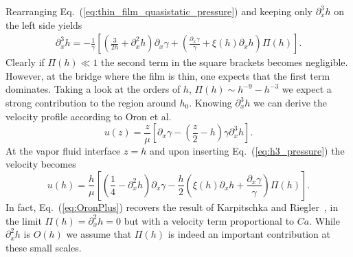 \documentclass[twocolumn,amsmath,amssymb,showpacs,pre,nofootinbib,superscriptaddress]{revtex4-1} %
\begin{document}
Rearranging Eq.~(\ref{eq:thin_film_quasistatic_pressure}) and keeping only $\partial_x^3 h$ on the left side yields
\begin{align}\label{eq:h3_pressure}
    \partial_x^3 h = -\frac{1}{\gamma}\left[\left(\frac{3}{2 h} + \partial_x^2 h \right)\partial_x\gamma 
    + \left(\frac{\partial_x\gamma}{\gamma}+\xi(h)\partial_x h\right)\Pi(h)\right].
\end{align}
Clearly if $\Pi(h)\ll 1$ the second term in the square brackets becomes negligible.
However, at the bridge where the film is thin, one expects that the first term dominates.
Taking a look at the orders of $h$, $\Pi(h) \sim h^{-9}-h^{-3}$ we expect a strong contribution to the region around $h_0$.
Knowing $\partial_x^3 h$ we can derive the velocity profile according to Oron et al.~\cite{RevModPhys.69.931}
\begin{equation}\label{eq:Oron_vel}
    u(z) = \frac{z}{\mu}\left[\partial_x\gamma - \left(\frac{z}{2} - h\right)\gamma\partial_x^3 h\right].
\end{equation}
At the vapor fluid interface $z=h$ and upon inserting Eq.~(\ref{eq:h3_pressure}) the velocity becomes
\begin{equation}\label{eq:OronPlus}
     u(h) = \frac{h}{\mu}\left[\left(\frac{1}{4}-\partial_x^2 h\right)\partial_x\gamma - \frac{h}{2}\left( \xi(h)\partial_x h + \frac{\partial_x\gamma}{\gamma}\right)\Pi(h)\right].
\end{equation}
In fact, Eq.~(\ref{eq:OronPlus}) recovers the result of Karpitschka and Riegler~\cite{PhysRevLett.109.066103}, in the limit $\Pi(h) = \partial_x^2h = 0$ but with a velocity term proportional to $Ca$.
While $\partial_x^2 h$ is $O(h)$ we assume that $\Pi(h)$ is indeed an important contribution at these small scales.
\end{document}
